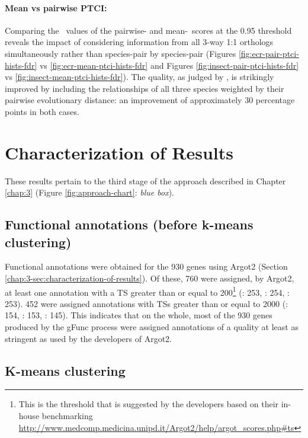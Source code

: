 \paragraph*{Mean vs pairwise PTCI:}
Comparing the \FDR\ values of the pairwise- and mean-\PTCI\ scores at the 0.95 threshold reveals the impact of considering information from all 3-way 1:1 orthologs simultaneously rather than species-pair by species-pair (Figures \ref{fig:ecr-pair-ptci-hists-fdr} vs \ref{fig:ecr-mean-ptci-hists-fdr} and Figures \ref{fig:insect-pair-ptci-hists-fdr} vs \ref{fig:insect-mean-ptci-hists-fdr}).
%
The quality, as judged by \FDR, is strikingly improved by including the relationships of all three species weighted by their pairwise evolutionary distance: an improvement of approximately 30 percentage points in both cases.

\section{Characterization of Results}
These results pertain to the third stage of the approach described in Chapter \ref{chap:3} (Figure \ref{fig:approach-chart}: \textit{blue box}).

\subsection{Functional annotations (before k-means clustering)}

Functional annotations were obtained for the 930 genes using \gls{Argot2} (Section \ref{chap:3-sec:characterization-of-results}).
%
Of these, 760 were assigned, by \gls{Argot2}, at least one annotation with a \gls{TS} greater than or equal to 200\footnote{This is the threshold that is suggested by the developers based on their in-house benchmarking \url{http://www.medcomp.medicina.unipd.it/Argot2/help/argot\_scores.php\#ts}} (\Aa: 253, \Ag: 254, \Cq: 253).
%
452 were assigned annotations with \glspl{TS} greater than or equal to 2000 (\Aa: 154, \Ag: 153, \Cq: 145).
%
This indicates that on the whole, most of the 930 genes produced by the \gls{gFunc} process were assigned annotations of a quality at least as stringent as used by the developers of \gls{Argot2}.


\subsection{K-means clustering}

